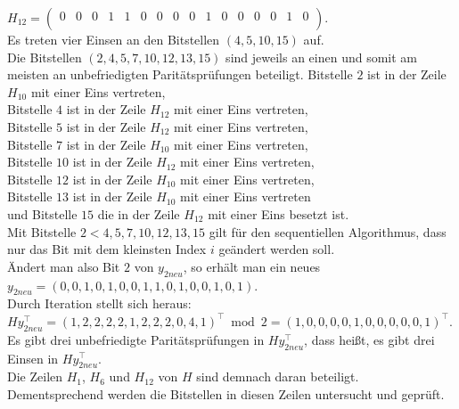 \begin{Beispiel}
    $H_{12}= \left( \begin{array}{rrrrrrrrrrrrrrrr}
        0 & 0 & 0 & 1 & 1 & 0 & 0 & 0 & 0 & 1 & 0 & 0 & 0 & 0 & 1 & 0 \\
       \end{array}\right). 
    $\\
    Es treten vier Einsen an den Bitstellen $(4, 5, 10, 15)$ auf.\\
    
    Die Bitstellen $(2, 4, 5, 7, 10, 12, 13, 15)$ sind jeweils an einen und somit am meisten an unbefriedigten Paritätsprüfungen beteiligt.
    Bitstelle $2$ ist in der Zeile $H_{10}$ mit einer Eins vertreten,\\
    Bitstelle $4$ ist in der Zeile $H_{12}$ mit einer Eins vertreten,\\
    Bitstelle $5$ ist in der Zeile $H_{12}$ mit einer Eins vertreten,\\
    Bitstelle $7$ ist in der Zeile $H_{10}$ mit einer Eins vertreten,\\ 
    Bitstelle $10$ ist in der Zeile $H_{12}$ mit einer Eins vertreten,\\
    Bitstelle $12$ ist in der Zeile $H_{10}$ mit einer Eins vertreten,\\
    Bitstelle $13$ ist in der Zeile $H_{10}$ mit einer Eins vertreten\\     
    und Bitstelle $15$ die in der Zeile $H_{12}$ mit einer Eins besetzt ist.\\
    Mit Bitstelle $2 < 4, 5, 7, 10, 12, 13, 15$ gilt für den sequentiellen Algorithmus, dass nur das Bit mit dem kleinsten Index $i$ geändert werden soll.\\
    
    Ändert man also Bit $2$ von $y_{2neu}$, so erhält man ein neues\\
    $y_{2neu} = (0,0,1,0,1,0,0,1,1,0,1,0,0,1,0,1).$\\
    
    Durch Iteration stellt sich heraus:\\
    $Hy_{2neu}^\intercal = (1,2,2,2,2,1,2,2,2,0,4,1)^\intercal \bmod 2 =(1,0,0,0,0,1,0,0,0,0,0,1)^\intercal.$\\
    
    Es gibt drei unbefriedigte Paritätsprüfungen in $Hy_{2neu}^\intercal$,
    dass hei\ss{}t, es gibt drei Einsen in $Hy_{2neu}^\intercal.$\\
    Die Zeilen $H_{1}$, $H_{6}$ und $H_{12}$ von $H$ sind demnach daran beteiligt.\\ 
    Dementsprechend werden die Bitstellen in diesen Zeilen untersucht und geprüft.\\
    

\end{Beispiel}
